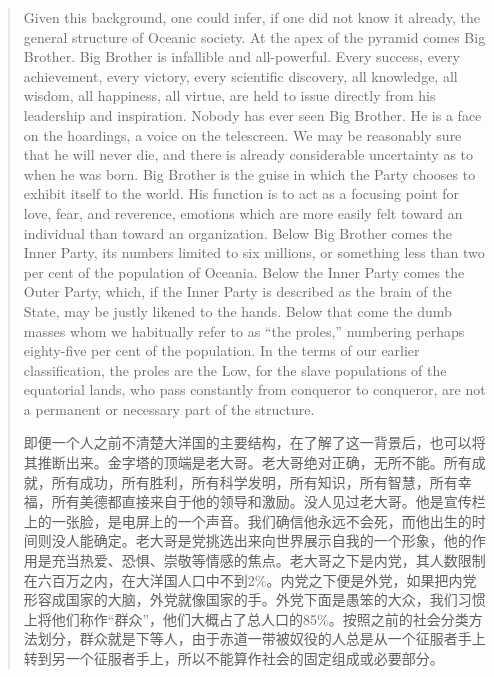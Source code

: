 \begin{paracol}{2}
\begin{quotation}
\switchcolumn*

Given this background, one could infer, if one did not know it already,
the general structure of Oceanic society. At the apex of the pyramid
comes Big Brother. Big Brother is infallible and all-powerful. Every
success, every achievement, every victory, every scientific discovery,
all knowledge, all wisdom, all happiness, all virtue, are held to issue
directly from his leadership and inspiration. Nobody has ever seen Big
Brother. He is a face on the hoardings, a voice on the telescreen. We
may be reasonably sure that he will never die, and there is already
considerable uncertainty as to when he was born. Big Brother is the
guise in which the Party chooses to exhibit itself to the world. His
function is to act as a focusing point for love, fear, and reverence,
emotions which are more easily felt toward an individual than toward an
organization. Below Big Brother comes the Inner Party, its numbers
limited to six millions, or something less than two per cent of the
population of Oceania. Below the Inner Party comes the Outer Party,
which, if the Inner Party is described as the brain of the State, may be
justly likened to the hands. Below that come the dumb masses whom we
habitually refer to as ``the proles,'' numbering perhaps eighty-five per
cent of the population. In the terms of our earlier classification, the
proles are the Low, for the slave populations of the equatorial lands,
who pass constantly from conqueror to conqueror, are not a permanent or
necessary part of the structure.

\switchcolumn

即便一个人之前不清楚大洋国的主要结构，在了解了这一背景后，也可以将其推断出来。金字塔的顶端是老大哥。老大哥绝对正确，无所不能。所有成就，所有成功，所有胜利，所有科学发明，所有知识，所有智慧，所有幸福，所有美德都直接来自于他的领导和激励。没人见过老大哥。他是宣传栏上的一张脸，是电屏上的一个声音。我们确信他永远不会死，而他出生的时间则没人能确定。老大哥是党挑选出来向世界展示自我的一个形象，他的作用是充当热爱、恐惧、崇敬等情感的焦点。老大哥之下是内党，其人数限制在六百万之内，在大洋国人口中不到2\%。内党之下便是外党，如果把内党形容成国家的大脑，外党就像国家的手。外党下面是愚笨的大众，我们习惯上将他们称作``群众''，他们大概占了总人口的85\%。按照之前的社会分类方法划分，群众就是下等人，由于赤道一带被奴役的人总是从一个征服者手上转到另一个征服者手上，所以不能算作社会的固定组成或必要部分。

\switchcolumn*


\end{quotation}
\end{paracol}
